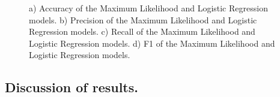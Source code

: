 \documentclass[letterpaper,12pt,openright,oneside]{article}
\begin{document}
\begin{figure}[H]
\centerline{}
\caption{a) Accuracy of the Maximum Likelihood and Logistic Regression models. b) Precision of the Maximum Likelihood and Logistic Regression models. c) Recall of the Maximum Likelihood and Logistic Regression models. d) F1 of the Maximum Likelihood and Logistic Regression models.}
\label{fig 247}
\end{figure}











\subsection{Discussion of results.}

\end{document}
